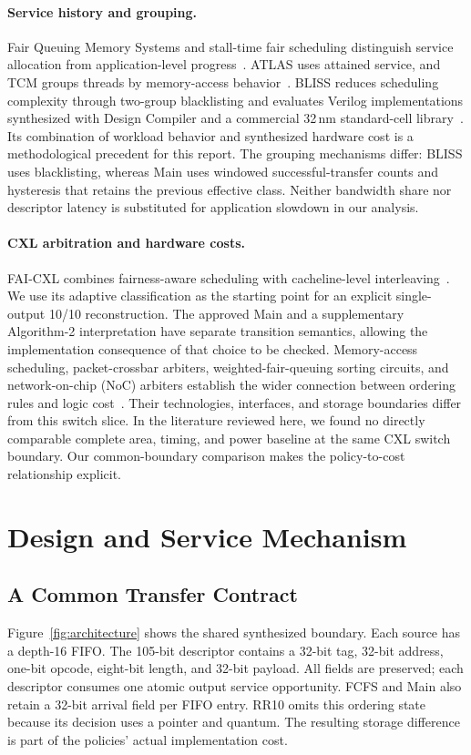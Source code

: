 \paragraph{Service history and grouping.}
Fair Queuing Memory Systems and stall-time fair scheduling distinguish service
allocation from application-level progress~\cite{fqmem,stfm}. ATLAS uses attained
service, and TCM groups threads by memory-access behavior~\cite{atlas,tcm}.
BLISS reduces scheduling complexity through two-group blacklisting and evaluates
Verilog implementations synthesized with Design Compiler and a commercial
32\,nm standard-cell library~\cite{bliss}. Its combination of workload behavior
and synthesized hardware cost is a methodological precedent for this report.
The grouping mechanisms differ: BLISS uses blacklisting, whereas Main uses
windowed successful-transfer counts and hysteresis that retains the previous
effective class.
Neither bandwidth share nor descriptor latency is substituted for application
slowdown in our analysis.

\paragraph{CXL arbitration and hardware costs.}
FAI-CXL combines fairness-aware scheduling with cacheline-level
interleaving~\cite{fai}. We use its adaptive classification as the starting point
for an explicit single-output 10/10 reconstruction. The approved Main and a
supplementary Algorithm-2 interpretation have separate transition semantics,
allowing the implementation consequence of that choice to be checked.
Memory-access scheduling, packet-crossbar arbiters, weighted-fair-queuing sorting
circuits, and network-on-chip (NoC) arbiters establish the wider connection between ordering rules
and logic cost~\cite{rixner,gupta,wfq_sort,arbiter_ppa}. Their technologies,
interfaces, and storage boundaries differ from this switch slice. In the
literature reviewed here, we found no directly comparable complete area, timing,
and power baseline at the same CXL switch boundary. Our common-boundary
comparison makes the policy-to-cost relationship explicit.

\section{Design and Service Mechanism}
\subsection{A Common Transfer Contract}
Figure~\ref{fig:architecture} shows the shared synthesized boundary. Each source
has a depth-16 FIFO. The 105-bit descriptor contains a 32-bit tag, 32-bit address,
one-bit opcode, eight-bit length, and 32-bit payload. All fields are preserved;
each descriptor consumes one atomic output service opportunity. FCFS and Main
also retain a 32-bit arrival field per FIFO entry. RR10 omits this ordering state
because its decision uses a pointer and quantum. The resulting storage difference
is part of the policies' actual implementation cost.

